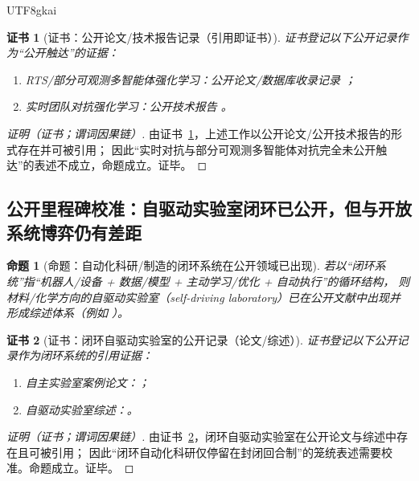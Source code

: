 \documentclass[12pt]{article}
\newtheorem{proposition}{命题}[section]
\newtheorem{Certificate}{证书}[section]
\begin{document}
\begin{CJK*}{UTF8}{gkai}
\begin{Certificate}[证书：公开论文/技术报告记录（引用即证书）]
\label{cert:public-realtime-marl-exists}
证书登记以下公开记录作为“公开触达”的证据：
\begin{enumerate}
  \item RTS/部分可观测多智能体强化学习：公开论文/数据库收录记录 \cite{ref_pubmed_31666705}；
  \item 实时团队对抗强化学习：公开技术报告 \cite{ref_openai_dota2}。
\end{enumerate}
\end{Certificate}

\begin{proof}[证明（证书；谓词因果链）]
由证书~\ref{cert:public-realtime-marl-exists}，上述工作以公开论文/公开技术报告的形式存在并可被引用；
因此“实时对抗与部分可观测多智能体对抗完全未公开触达”的表述不成立，命题成立。证毕。
\end{proof}

\subsection{公开里程碑校准：自驱动实验室闭环已公开，但与开放系统博弈仍有差距}
\label{sec:calibration-public-sdl-gap}

\begin{proposition}[命题：自动化科研/制造的闭环系统在公开领域已出现]
\label{prop:public-self-driving-lab-exists}
若以“闭环系统”指“机器人/设备 + 数据/模型 + 主动学习/优化 + 自动执行”的循环结构，
则材料/化学方向的自驱动实验室（self-driving laboratory）已在公开文献中出现并形成综述体系（例如 \cite{ref_nature_2023_06734_w,ref_acs_chemrev_4c00055}）。
\end{proposition}

\begin{Certificate}[证书：闭环自驱动实验室的公开记录（论文/综述）]
\label{cert:public-self-driving-lab-exists}
证书登记以下公开记录作为闭环系统的引用证据：
\begin{enumerate}
  \item 自主实验室案例论文：\cite{ref_nature_2023_06734_w}；
  \item 自驱动实验室综述：\cite{ref_acs_chemrev_4c00055}。
\end{enumerate}
\end{Certificate}

\begin{proof}[证明（证书；谓词因果链）]
由证书~\ref{cert:public-self-driving-lab-exists}，闭环自驱动实验室在公开论文与综述中存在且可被引用；
因此“闭环自动化科研仅停留在封闭回合制”的笼统表述需要校准。命题成立。证毕。
\end{proof}


\end{CJK*}
\end{document}
